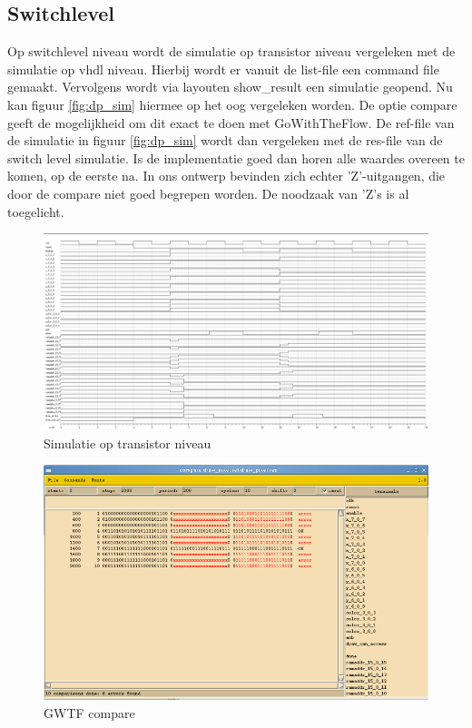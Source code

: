 \documentclass{scrartcl} %
\begin{document}
\subsection{Switchlevel}
Op switchlevel niveau wordt de simulatie op transistor niveau vergeleken met de simulatie op vhdl niveau. Hierbij wordt er vanuit de list-file een command file gemaakt. Vervolgens wordt via layout\simulate en show\_result een simulatie geopend. Nu kan figuur \ref{fig:dp_sim} hiermee op het oog vergeleken worden. De optie compare geeft de mogelijkheid om dit exact te doen met GoWithTheFlow. De ref-file van de simulatie in figuur \ref{fig:dp_sim} wordt dan vergeleken met de res-file van de switch level simulatie. Is de implementatie goed dan horen alle waardes overeen te komen, op de eerste na. In ons ontwerp bevinden zich echter 'Z'-uitgangen, die door de compare niet goed begrepen worden. De noodzaak van 'Z's is al toegelicht. 


\begin{figure} [h!]
\includegraphics [width = \textwidth] {resource/dp_sw_lev}
\caption{Simulatie op transistor niveau}
\label{fig:dp_sw_lev}
\end{figure}



\begin{figure} [h!]
\includegraphics [width = \textwidth] {resource/dp_comp}
\caption{GWTF compare}
\label{fig:dp_comp}
\end{figure}
\end{document}
